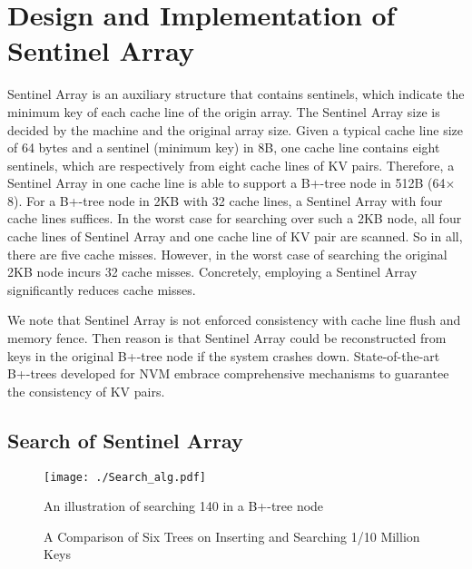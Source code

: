 \section{Design and Implementation of Sentinel Array}

Sentinel Array is an auxiliary structure that contains sentinels, which indicate the minimum key of each cache line of the origin array. The Sentinel Array size is decided by the machine and the original array size. Given a typical cache line size of 64 bytes and a sentinel (minimum key) in 8B, one cache line contains eight sentinels, which are respectively from eight cache lines of KV pairs. Therefore, a Sentinel Array in one cache line is able to support a B+-tree node in 512B (64$\times$8). For a B+-tree node in 2KB with 32 cache lines, a Sentinel Array with four cache lines suffices. In the worst case for searching over such a 2KB node, all four cache lines of Sentinel Array and one cache line of KV pair are scanned. So in all, there are five cache misses. However, in the worst case of searching the original 2KB node incurs 32 cache misses. Concretely, employing a Sentinel Array significantly reduces cache misses.

We note that Sentinel Array is not enforced consistency with cache line flush and memory fence. Then reason is that Sentinel Array could be reconstructed from keys in the original B+-tree node if the system crashes down. State-of-the-art B+-trees developed for NVM embrace comprehensive mechanisms to guarantee the consistency of KV pairs.

\subsection{Search of Sentinel Array}

\begin{figure}[htbp]
\centerline{\texttt{[image: ./Search\_alg.pdf]}}
\caption{An illustration of searching 140 in a B+-tree node}
\label{search_alg}
\end{figure}

\begin{figure*}[t]
	\centering
	\centering
	\caption{A Comparison of Six Trees on Inserting and Searching 1/10 Million Keys}
	\label{10m_testing} 
\end{figure*}

